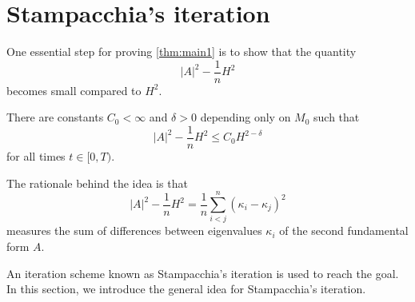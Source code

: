 \section{Stampacchia's iteration}
One essential step for proving \autoref{thm:main1} is to show that the quantity \[\left| A \right| ^2-\frac{1}{n}H^2\] becomes small compared to $H^2$.

\begin{theorem} \label{PinEs}
	There are constants $C_0<\infty $ and $\delta >0$ depending only on $M_0$ such that 
	\[\left| A \right| ^2-\frac{1}{n}H^2 \leq C_0 H^{2-\delta }\]
	for all times $t \in [0,T)$. 
\end{theorem}

The rationale behind the idea is that
\[\left| A \right| ^2-\frac{1}{n}H^2=\frac{1}{n}\sum_{i<j}^{n}(\kappa _i-\kappa _j)^2\]
measures the sum of differences between eigenvalues $\kappa _i$ of the second fundamental form $A$. 

An iteration scheme known as Stampacchia's iteration is used to reach the goal. In this section, we introduce the general idea for Stampacchia's iteration.

